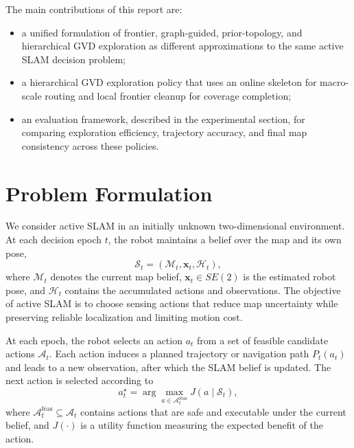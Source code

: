\documentclass[conference]{IEEEtran}
\begin{document}
The main contributions of this report are:
\begin{itemize}
    \item a unified formulation of frontier, graph-guided, prior-topology, and hierarchical GVD exploration as different approximations to the same active SLAM decision problem;
    \item a hierarchical GVD exploration policy that uses an online skeleton for macro-scale routing and local frontier cleanup for coverage completion;
    \item an evaluation framework, described in the experimental section, for comparing exploration efficiency, trajectory accuracy, and final map consistency across these policies.
\end{itemize}



\section{Problem Formulation}

We consider active SLAM in an initially unknown two-dimensional environment. At each decision epoch $t$, the robot maintains a belief over the map and its own pose,
\begin{equation}
\mathcal{S}_t = \left(\mathcal{M}_t,\mathbf{x}_t,\mathcal{H}_t\right),
\end{equation}
where $\mathcal{M}_t$ denotes the current map belief, $\mathbf{x}_t\in SE(2)$ is the estimated robot pose, and $\mathcal{H}_t$ contains the accumulated actions and observations. The objective of active SLAM is to choose sensing actions that reduce map uncertainty while preserving reliable localization and limiting motion cost.

At each epoch, the robot selects an action $a_t$ from a set of feasible candidate actions $\mathcal{A}_t$. Each action induces a planned trajectory or navigation path $P_t(a_t)$ and leads to a new observation, after which the SLAM belief is updated. The next action is selected according to
\begin{equation}
a_t^\star =
\arg\max_{a\in\mathcal{A}_t^{\mathrm{feas}}}
J(a\mid\mathcal{S}_t),
\end{equation}
where $\mathcal{A}_t^{\mathrm{feas}}\subseteq\mathcal{A}_t$ contains actions that are safe and executable under the current belief, and $J(\cdot)$ is a utility function measuring the expected benefit of the action.
\end{document}
